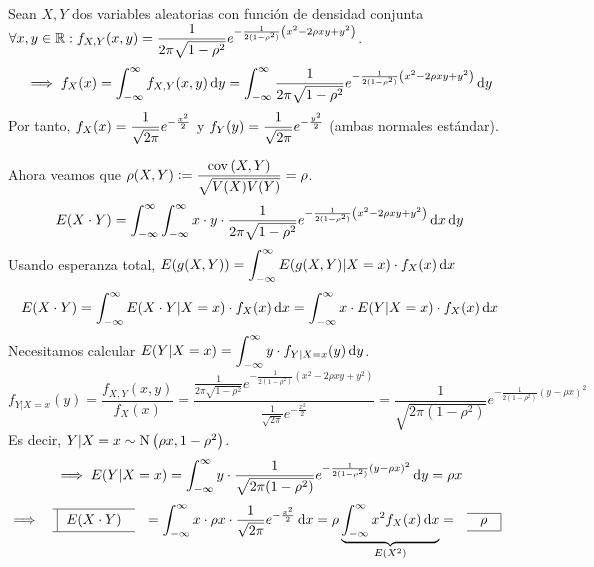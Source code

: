 \begin{ejem}
	Sean $X, Y$ dos variables aleatorias con función de densidad conjunta $\displaystyle \forall x, y \in \mathbb{R} : f_{X, Y}(x, y) = \frac{1}{2\pi \sqrt{1-\rho^2}} e^{-\frac{1}{2(1-\rho^2)}\left(x^2 - 2\rho x y + y^2\right)}$.
	\[\implies f_X(x) = \int_{-\infty}^{\infty} f_{X, Y}(x, y) \odif{y} = \int_{-\infty}^{\infty} \frac{1}{2\pi \sqrt{1-\rho^2}} e^{-\frac{1}{2(1-\rho^2)}\left(x^2 - 2\rho x y + y^2\right)} \odif{y}\]
	Por tanto, $\displaystyle f_X(x) = \frac{1}{\sqrt{2\pi}} e^{-\frac{x^2}{2}}$ y $\displaystyle f_Y(y) = \frac{1}{\sqrt{2\pi}} e^{-\frac{y^2}{2}}$ (ambas normales estándar).

	Ahora veamos que $\displaystyle \rho(X, Y) \vcentcolon= \frac{\operatorname{cov}\left(X, Y\right)}{\sqrt{V(X) V(Y)}} = \rho$.
	\[E(X\cdot Y) = \int_{-\infty}^{\infty} \int_{-\infty}^{\infty} x\cdot y \cdot \frac{1}{2\pi \sqrt{1-\rho^2}} e^{-\frac{1}{2(1-\rho^2)}\left(x^2 - 2\rho x y + y^2\right)} \odif{x} \odif{y}\] %
	Usando esperanza total, $\ds E(g(X, Y)) = \int_{-\infty}^{\infty} E(g(X, Y) \vert X = x) \cdot f_X(x) \odif{x}$
	\[E(X\cdot Y) = \int_{-\infty}^{\infty} E(X\cdot Y \vert X = x) \cdot f_X(x) \odif{x} = \int_{-\infty}^{\infty} x \cdot E(Y \vert X = x) \cdot f_X(x) \odif{x}\]
	Necesitamos calcular $\ds E(Y \vert X = x) = \int_{-\infty}^{\infty} y \cdot f_{Y|X=x}(y) \odif{y}$.
	\[f_{Y|X=x}(y) = \frac{f_{X, Y}(x, y)}{f_X(x)} = \frac{\frac{1}{2\pi \sqrt{1-\rho^2}} e^{-\frac{1}{2(1-\rho^2)}\left(x^2 - 2\rho x y + y^2\right)}}{\frac{1}{\sqrt{2\pi}} e^{-\frac{x^2}{2}}} = \frac{1}{\sqrt{2\pi(1-\rho^2)}} e^{-\frac{1}{2(1-\rho^2)}\left(y-\rho x\right)^2}\]
	Es decir, $Y \vert X = x \sim \operatorname{N}\left(\rho x, 1-\rho^2\right)$.
	\[\implies E(Y \vert X = x) = \int_{-\infty}^{\infty} y \cdot \frac{1}{\sqrt{2\pi(1-\rho^2)}} e^{-\frac{1}{2(1-\rho^2)}\left(y-\rho x\right)^2} \odif{y} = \rho x\]
	\[\implies \lbox{E(X\cdot Y)} = \int_{-\infty}^{\infty} x \cdot \rho x \cdot \frac{1}{\sqrt{2\pi}} e^{-\frac{x^2}{2}} \odif{x} = \rho \underbrace{\int_{-\infty}^{\infty} x^2 f_X(x) \odif{x}}_{E\left(X^2\right)} = \rbox{\rho}\]
\end{ejem}
